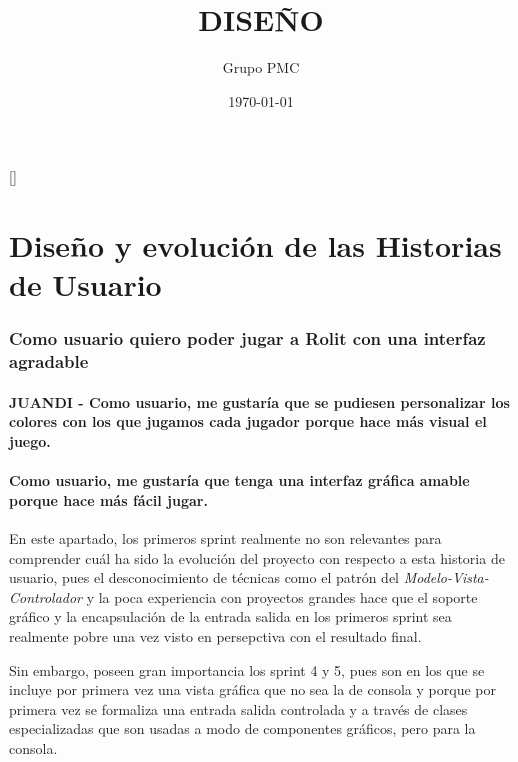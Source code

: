 \documentclass[12pt,a4paper,openright]{book}
\title{\Huge DISEÑO}
\date{\today}
\author{Grupo PMC}
\newcommand{\defaultformat}{
	\titleformat{\chapter}[display]{\centering\normalfont\huge\bfseries}{}{0pt}{\Huge \uppercase{##1}}[\titlerule]
    \titleformat{\section}{\normalfont\Large\bfseries}{}{0pt}{##1}
    \titleformat{\subsection}{\normalfont\large\bfseries}{}{0pt}{\uline{##1}}
    \titleformat{\subsubsection}{\normalfont\normalsize\bfseries}{}{0pt}{##1}
}
\theoremstyle{break}
\begin{document}
\defaultformat
\maketitle
\setcounter{tocdepth}{3}
\setcounter{secnumdepth}{3}
\tableofcontents

\chapter{Diseño y evolución de las Historias de Usuario}

\subsection{Como usuario quiero poder jugar a Rolit con una interfaz agradable}

\subsubsection{JUANDI - Como usuario, me gustaría que se pudiesen personalizar los colores con los que jugamos cada jugador porque hace más visual el juego.}

\subsubsection{Como usuario, me gustaría que tenga una interfaz gráfica amable porque hace más fácil jugar.}
En este apartado, los primeros sprint realmente no son relevantes para comprender cuál ha sido la evolución del proyecto con respecto a esta historia de usuario, pues el desconocimiento de técnicas como el patrón del \textit{Modelo-Vista-Controlador} y la poca experiencia con proyectos grandes hace que el soporte gráfico y la encapsulación de la entrada salida en los primeros sprint sea realmente pobre una vez visto en persepctiva con el resultado final.

Sin embargo, poseen gran importancia los sprint 4 y 5, pues son en los que se incluye por primera vez una vista gráfica que no sea la de consola y porque por primera vez se formaliza una entrada salida controlada y a través de clases especializadas que son usadas a modo de componentes gráficos, pero para la consola.
\end{document}
